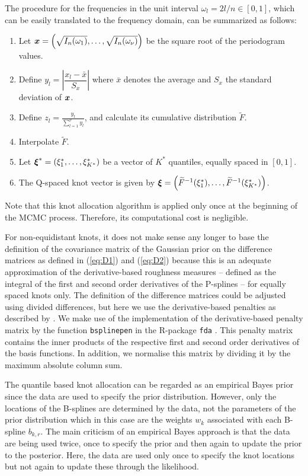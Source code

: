 \documentclass[twocolumn,final]{svjour3}
\newcommand{\bm}[1]{\mbox{\boldmath $#1$}}
\newcommand{\pmr}{ \color{red}}
\begin{document}
{\pmr
The procedure for the frequencies in the unit interval $\omega_l = 2 l/n  \in[0,1]$, which can be easily translated to the frequency domain, can be summarized as follows:	
\begin{enumerate}
	\item Let $\bm{x} = \left (\sqrt{I_n(\omega_1)}, \dots, \sqrt{I_n(\omega_{\nu})} \right)$ be the square root of the periodogram values.
	\item Define $y_l = \left|\dfrac{x_l - \bar{x}}{S_x} \right|$ where $\bar{x}$ denotes the average and $S_x$ the standard deviation of ${\bm x}$.
	\item Define $z_l = \frac{y_l}{\sum_{l=1}^{\nu} y_l}$, and calculate its cumulative distribution $\widetilde{F}$.
	\item Interpolate $\widetilde{F}$.
	\item Let $\bm{\xi}^* = \left(\xi_1^*,\dots,\xi_{K^*}^* \right)$ be a vector of $K^*$ quantiles, equally spaced in $[0,1]$.
	\item The Q-spaced knot vector is given by $\bm{\xi} = \left(\widetilde{F}^{-1}(\xi^*_1),\dots, \widetilde{F}^{-1}(\xi^*_{K^*}) \right)$. %
\end{enumerate}

Note that this knot allocation algorithm is applied only once at the beginning of the MCMC process.  Therefore, its computational cost is negligible.

}

For non-equidistant knots, it does not make sense any longer to base the definition of the covariance matrix of the Gaussian prior  on the  difference matrices as defined in (\ref{eq:D1}) and (\ref{eq:D2}) because this is an adequate approximation of the derivative-based roughness measures -- defined as the integral of the first and second order derivatives of the P-splines -- 
for equally spaced knots only. The definition of the difference matrices could be adjusted using divided differences, but here we use the derivative-based penalties as described by \cite{WoodSimon2017Pwdb}. We make use of the implementation of the derivative-based penalty matrix  by the function {\tt bsplinepen} in the R-package {\tt fda} \citep{fda}. This penalty matrix contains the inner products of the respective first and second order derivatives of the basis functions. In addition, we normalise this matrix by dividing it by the maximum absolute column sum.

The quantile based knot allocation can be regarded as an empirical Bayes prior since the data are used to specify the prior distribution.  However, only the locations of the B-splines are determined by the data, not the parameters of the prior distribution which in this case are the weights $w_k$ associated with each B-spline $b_{k,r}$.  The main criticism of an empirical Bayes approach is that the data are being used twice, once to specify the prior and then again to update the prior to the posterior. Here, the data are used only once to specify the knot locations but not again to update these through the likelihood.
\end{document}
